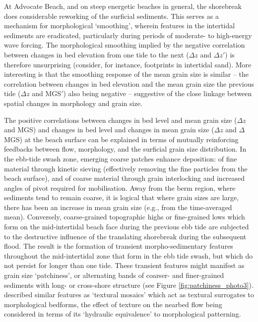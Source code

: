 \documentclass[jmse,article,submit,pdftex,moreauthors]{Definitions/mdpi}
\begin{document}
At Advocate Beach, and on steep energetic beaches in general, the shorebreak does considerable reworking of the surficial sediments. This serves as a mechanism for morphological `smoothing', wherein features in the intertidal sediments are eradicated, particularly during periods of moderate- to high-energy wave forcing. The morphological smoothing implied by the negative correlation between changes in bed elevation from one tide to the next ($\Delta z$ and $\Delta z'$) is therefore unsurprising (consider, for instance, footprints in intertidal sand). More interesting is that the smoothing response of the mean grain size is similar -- the correlation between changes in bed elevation and the mean grain size the previous tide ($\Delta z$ and MGS$'$) also being negative -- suggestive of the close linkage between spatial changes in morphology and grain size.


The positive correlations between changes in bed level and mean grain size ($\Delta z$ and MGS) and changes in bed level and changes in mean grain size ($\Delta z$ and $\Delta$MGS) at the beach surface can be explained in terms of mutually reinforcing feedbacks between flow, morphology, and the surficial grain size distribution. In the ebb-tide swash zone, emerging coarse patches enhance deposition: of fine material through kinetic sieving (effectively removing the fine particles from the beach surface), and of coarse material through grain interlocking and increased angles of pivot required for mobilisation. Away from the berm region, where sediments tend to remain coarse, it is logical that where grain sizes are large, there has been an increase in mean grain size (e.g., from the time-averaged mean). Conversely, coarse-grained topographic highs or fine-grained lows which form on the mid-intertidal beach face during the previous ebb tide are subjected to the destructive influence of the translating shorebreak during the subsequent flood. The result is the formation of transient morpho-sedimentary features throughout the mid-intertidal zone that form in the ebb tide swash, but which do not persist for longer than one tide. These transient features might manifest as grain size `patchiness', or alternating bands of coarser- and finer-grained sediments with long- or cross-shore structure (see Figure \ref{fig:patchiness_photo3}). \citet{Buscombe_Masselink2006} described similar features as `textural mosaics' which act as textural surrogates to morphological bedforms, the effect of texture on the nearbed flow being considered in terms of its `hydraulic equivalence' to morphological patterning.
\end{document}
